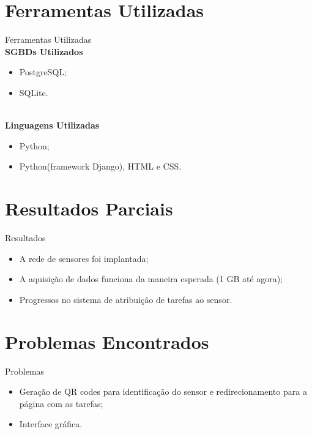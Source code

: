 \documentclass{beamer}
\begin{document}
  \section{Ferramentas Utilizadas}
  \begin{frame}{Ferramentas Utilizadas}
    \\\textbf{SGBDs Utilizados}
    \begin{itemize}
      \item PostgreSQL;
      \item SQLite.
    \end{itemize}
    \\\textbf{Linguagens Utilizadas}
        \begin{itemize}
            \item Python;
            \item Python(framework Django), HTML e CSS.
        \end{itemize}
  \end{frame}

  \section{Resultados Parciais}
  \begin{frame}{ Resultados }
        \begin{itemize}
            \item A rede de sensores foi implantada;
            \item A aquisi\c{c}\~ao de dados funciona da maneira esperada (1 GB at\'{e} agora);
            \item Progressos no sistema de atribui\c{c}\~ao de tarefas ao sensor.
        \end{itemize}
  \end{frame}

  \section{Problemas Encontrados}
  \begin{frame}{Problemas}
        \begin{itemize}
            \item Gera\c{c}\~ao de QR codes para identifica\c{c}\~ao do sensor e redirecionamento para a p\'agina com as tarefas;
            \item Interface gr\'afica.
        \end{itemize}
  \end{frame}
\end{document}
